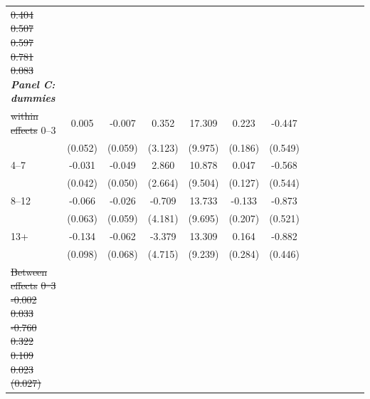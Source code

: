 \documentclass[12pt,english]{article}
\providecommand{\DIFdeltex}[1]{{\protect\color{red}\sout{#1}}}                      %
\providecommand{\DIFdelFL}[1]{\DIFdel{#1}} %
\providecommand{\DIFdelbeginFL}{} %
\providecommand{\DIFdelendFL}{} %
\providecommand{\DIFdel}[1]{\texorpdfstring{\DIFdeltex{#1}}{}} %
\begin{document}
\begin{table}[!ht]
\begin{center}
\begin{adjustbox}{max width=.9\linewidth}
\begin{threeparttable}
{\begin{tabular}{l*{6}{S S}}
\DIFdelFL{0.404         }%
\DIFdelFL{0.507         }%
\DIFdelFL{0.597         }%
\DIFdelFL{0.781         }%
\DIFdelFL{0.083         }%
\DIFdelendFL \textit{\textbf{Panel C: dummies}} &&&&&&\\
						\DIFdelbeginFL \DIFdelFL{within effects}%
\DIFdelendFL 0--3&    0.005         &   -0.007         &    0.352         &   17.309\sym{*}  &    0.223         &   -0.447         \\
						&  (0.052)         &  (0.059)         &  (3.123)         &  (9.975)         &  (0.186)         &  (0.549)         \\
						4--7&    -0.031         &   -0.049         &    2.860         &   10.878         &    0.047         &   -0.568         \\
						&  (0.042)         &  (0.050)         &  (2.664)         &  (9.504)         &  (0.127)         &  (0.544)         \\
						8--12&    -0.066         &   -0.026         &   -0.709         &   13.733         &   -0.133         &   -0.873\sym{*}  \\
						&  (0.063)         &  (0.059)         &  (4.181)         &  (9.695)         &  (0.207)         &  (0.521)         \\
						13+&   -0.134         &   -0.062         &   -3.379         &   13.309         &    0.164         &   -0.882\sym{**} \\
						&  (0.098)         &  (0.068)         &  (4.715)         &  (9.239)         &  (0.284)         &  (0.446)         \\
						\DIFdelbeginFL \DIFdelFL{Between effects}%
\DIFdelFL{0--3}%
\DIFdelFL{-0.002         }%
\DIFdelFL{0.033         }%
\DIFdelFL{-0.760         }%
\DIFdelFL{0.322         }%
\DIFdelFL{0.109}%
\DIFdelFL{0.023         }%
\DIFdelFL{(0.027)         }%

\end{tabular}}
\end{threeparttable}
\end{adjustbox}
\end{center}
\end{table}
\end{document}
